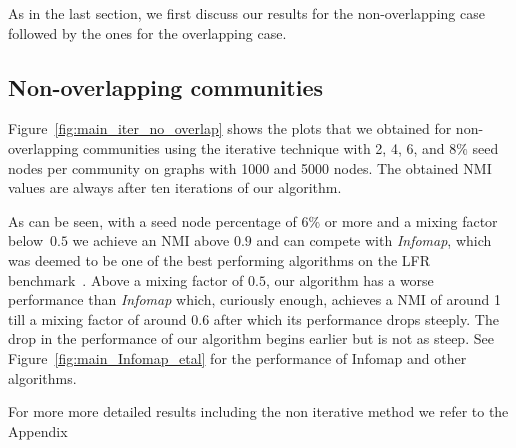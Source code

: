 \newcommand{\plotwidth}{0.8\linewidth}
\newcommand{\cfinderwidth}{0.96\linewidth}
\newcommand{\otherplotswidth}{0.76\linewidth}

As in the last section, we first discuss our results for the non-overlapping case followed by 
the ones for the overlapping case.

\subsection{Non-overlapping communities}
Figure~\ref{fig:main_iter_no_overlap} shows the plots that we obtained for non-overlapping communities using the iterative technique with 2, 4, 6, and 8$\%$ seed nodes per 
community on graphs with 1000 and 5000 nodes. The obtained NMI values are always after ten iterations of our algorithm.

As can be seen, with a seed node percentage of 6$\%$ or more and 
a mixing factor below~$0.5$ we achieve an NMI above $0.9$ and can compete with \textit{Infomap}, 
which was deemed to be one of the best performing algorithms on the LFR benchmark~\cite{LF09}. 
Above a mixing factor of $0.5$, our algorithm has a worse performance than \textit{Infomap} 
which, curiously enough, achieves a NMI of around 1 till a mixing factor of around 
$0.6$ after which its performance drops steeply. The drop in the performance of our algorithm 
begins earlier but is not as steep. See Figure~\ref{fig:main_Infomap_etal} for the performance 
of Infomap and other algorithms.

For more more detailed results including the non iterative method we refer to the Appendix
 
 


